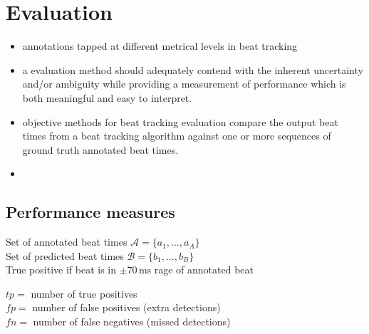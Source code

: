 \documentclass{scrartcl}
\begin{document}










\newpage
\section{Evaluation}


\begin{itemize}
\item annotations tapped at different metrical levels in beat tracking
\item a evaluation method should adequately contend with the inherent uncertainty and/or ambiguity while providing a measurement of performance which is both meaningful and easy to interpret. \cite{Davies2009b}
\item objective methods for beat tracking evaluation compare the output beat times from a beat tracking algorithm against one or more sequences of ground truth annotated beat times. \cite{Davies2009b}
\item 
\end{itemize}


\subsection{Performance measures}

Set of annotated beat times $\mathcal A = \{a_1, \dots, a_A\}$ \\
Set of predicted beat times $\mathcal B = \{b_1, \dots, b_B\}$ \\

True positive if beat is in $\pm 70\,\text{ms}$ rage of annotated beat

$tp =$ number of true positives \\
$fp =$ number of false positives (extra detections) \\
$fn =$ number of false negatives (missed detections) 
\end{document}

